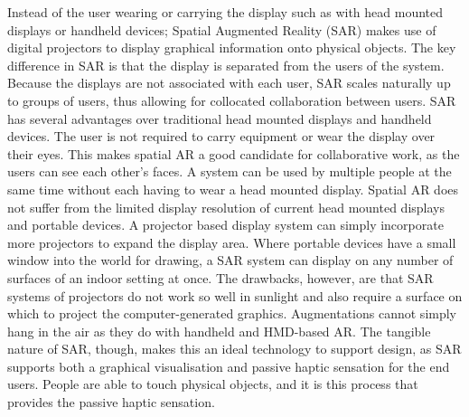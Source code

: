 Instead of the user wearing or carrying the display such as with head mounted displays or handheld devices; Spatial Augmented Reality (SAR) makes use of digital projectors to display graphical information onto physical objects. The key difference in SAR is that the display is separated from the users of the system. Because the displays are not associated with each user, SAR scales naturally up to groups of users, thus allowing for collocated collaboration between users. SAR has several advantages over traditional head mounted displays and handheld devices. The user is not required to carry equipment or wear the display over their eyes. This makes spatial AR a good candidate for collaborative work, as the users can see each other’s faces. A system can be used by multiple people at the same time without each having to wear a head mounted display. Spatial AR does not suffer from the limited display resolution of current head mounted displays and portable devices. A projector based display system can simply incorporate more projectors to expand the display area. Where portable devices have a small window into the world for drawing, a SAR system can display on any number of surfaces of an indoor setting at once. The drawbacks, however, are that SAR systems of projectors do not work so well in sunlight and also require a surface on which to project the computer-generated graphics. Augmentations cannot simply hang in the air as they do with handheld and HMD-based AR. The tangible nature of SAR, though, makes this an ideal technology to support design, as SAR supports both a graphical visualisation and passive haptic sensation for the end users. People are able to touch physical objects, and it is this process that provides the passive haptic sensation.